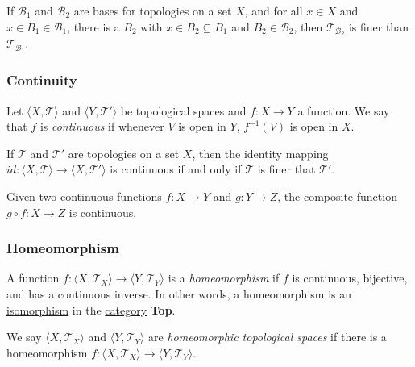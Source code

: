 \begin{proposition}
If $\mathcal{B}_1$ and $\mathcal{B}_2$ are bases for topologies on a set $X$, and for all $x \in X$ and $x \in B_1 \in \mathcal{B}_1$, there is a $B_2$ with $x \in B_2 \subseteq B_1$
and $B_2 \in \mathcal{B}_2$, then $\mathcal{T}_{\mathcal{B}_2}$ is finer than $\mathcal{T}_{\mathcal{B}_1}$.
\end{proposition}

\subsubsection{Continuity}\label{topologicalcontinuity}
Let $\langle X,\mathcal{T} \rangle$ and $\langle Y,\mathcal{T}' \rangle$ be topological spaces and $f:X \rightarrow Y$ a function. We say that $f$ is \emph{continuous} if whenever $V$ is
open in $Y$, $f^{-1}(V)$ is open in $X$.

\begin{proposition}
If $\mathcal{T}$ and $\mathcal{T}'$ are topologies on a set $X$, then the identity mapping $id:\langle X,\mathcal{T} \rangle \rightarrow \langle X,\mathcal{T}' \rangle$ is
continuous if and only if $\mathcal{T}$ is finer that $\mathcal{T}'$.
\end{proposition}

\begin{theorem}
Given two continuous functions $f : X \rightarrow Y$ and $g : Y \rightarrow Z$, the composite function $g \circ f : X \rightarrow Z$ is continuous.
\end{theorem}

\subsubsection{Homeomorphism}\label{homeomorphism}
A function $f : \langle X,\mathcal{T}_X \rangle \rightarrow \langle Y,\mathcal{T}_Y \rangle$ is a \emph{homeomorphism} if $f$ is continuous, bijective, and has a continuous inverse. In other words, a homeomorphism is
an \hyperref[isomorphism]{isomorphism} in the \hyperref[category]{category} \textbf{Top}.

\label{homeomorphicspaces}
We say $\langle X,\mathcal{T}_X \rangle$ and $\langle Y,\mathcal{T}_Y \rangle$ are \emph{homeomorphic topological spaces} if there is a homeomorphism $f:\langle X,\mathcal{T}_X \rangle \rightarrow \langle Y,\mathcal{T}_Y \rangle$.